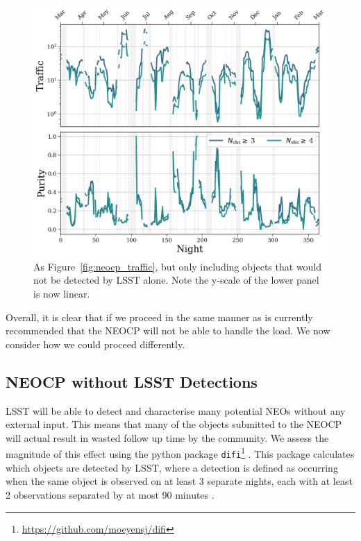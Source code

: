 \documentclass[twocolumn, twocolappendix]{aastex631}
\newcommand{\needcite}{{\color{magenta}{(needs citation)}}}
\begin{document}
\begin{figure}
    \centering
    \includegraphics[width=\textwidth]{traffic_purity_unfindable.png}
    \caption{As Figure~\ref{fig:neocp_traffic}, but only including objects that would not be detected by LSST alone. Note the y-scale of the lower panel is now linear.}
    \label{fig:neocp_traffic_unfindable}
\end{figure}

Overall, it is clear that if we proceed in the same manner as is currently recommended that the NEOCP will not be able to handle the load. We now consider how we could proceed differently.

\subsection{NEOCP without LSST Detections}\label{sec:no_LSST_detections}

LSST will be able to detect and characterise many potential NEOs without any external input. This means that many of the objects submitted to the NEOCP will actual result in wasted follow up time by the community. We assess the magnitude of this effect using the python package \texttt{difi}\footnote{\url{https://github.com/moeyensj/difi}} \needcite{}. This package calculates which objects are detected by LSST, where a detection is defined as occurring when the same object is observed on at least 3 separate nights, each with at least 2 observations separated by at most 90 minutes \needcite{}.
\end{document}
